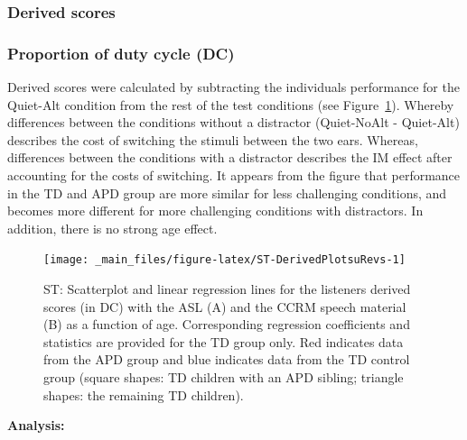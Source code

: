 \documentclass[a4paper, twoside]{templates/ociamthesis}
\begin{document}
\hypertarget{derived-scores}{%
\subsubsection{Derived scores}\label{derived-scores}}

\hypertarget{proportion-of-duty-cycle-dc}{%
\subsubsection{Proportion of duty cycle (DC)}\label{proportion-of-duty-cycle-dc}}

Derived scores were calculated by subtracting the individuals performance for the Quiet-Alt condition from the rest of the test conditions (see Figure~\ref{fig:ST-DerivedPlotsuRevs}). Whereby differences between the conditions without a distractor (Quiet-NoAlt - Quiet-Alt) describes the cost of switching the stimuli between the two ears. Whereas, differences between the conditions with a distractor describes the IM effect after accounting for the costs of switching. It appears from the figure that performance in the TD and APD group are more similar for less challenging conditions, and becomes more different for more challenging conditions with distractors. In addition, there is no strong age effect.

\begin{figure}[h]

{\centering \texttt{[image: \_main\_files/figure-latex/ST-DerivedPlotsuRevs-1]} 

}

\caption{ST: Scatterplot and linear regression lines for the listeners derived scores (in DC) with the ASL (A) and the CCRM speech material (B) as a function of age. Corresponding regression coefficients and statistics are provided for the TD group only. Red indicates data from the APD group and blue indicates data from the TD control group (square shapes: TD children with an APD sibling; triangle shapes: the remaining TD children).}\label{fig:ST-DerivedPlotsuRevs}
\end{figure}

\textbf{Analysis:}
\end{document}
